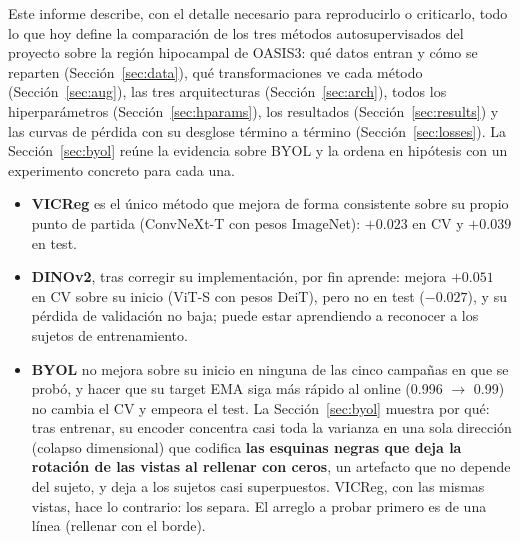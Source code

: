 \documentclass[11pt,a4paper]{article}
\begin{document}
Este informe describe, con el detalle necesario para reproducirlo o criticarlo, todo
lo que hoy define la comparación de los tres métodos autosupervisados del proyecto
sobre la región hipocampal de OASIS3: qué datos entran y cómo se reparten
(Sección~\ref{sec:data}), qué transformaciones ve cada método (Sección~\ref{sec:aug}),
las tres arquitecturas (Sección~\ref{sec:arch}), todos los hiperparámetros
(Sección~\ref{sec:hparams}), los resultados (Sección~\ref{sec:results}) y las curvas de
pérdida con su desglose término a término (Sección~\ref{sec:losses}). La
Sección~\ref{sec:byol} reúne la evidencia sobre BYOL y la ordena en hipótesis con un
experimento concreto para cada una.

\begin{tldrbox}
\begin{itemize}[leftmargin=12pt]
\item \textbf{VICReg} es el único método que mejora de forma consistente sobre su propio
  punto de partida (ConvNeXt-T con pesos ImageNet): $+0.023$ en CV y $+0.039$ en test.
\item \textbf{DINOv2}, tras corregir su implementación, por fin aprende: mejora $+0.051$
  en CV sobre su inicio (ViT-S con pesos DeiT), pero no en test ($-0.027$), y su pérdida de
  validación no baja; puede estar aprendiendo a reconocer a los sujetos de entrenamiento.
\item \textbf{BYOL} no mejora sobre su inicio en ninguna de las cinco campañas en que se
  probó, y hacer que su target EMA siga más rápido al online (0.996 $\rightarrow$ 0.99) no
  cambia el CV y empeora el test. La Sección~\ref{sec:byol} muestra por qué: tras entrenar,
  su encoder concentra casi toda la varianza en una sola dirección (colapso dimensional) que
  codifica \textbf{las esquinas negras que deja la rotación de las vistas al rellenar con
  ceros}, un artefacto que no depende del sujeto, y deja a los sujetos casi superpuestos.
  VICReg, con las mismas vistas, hace lo contrario: los separa. El arreglo a probar primero
  es de una línea (rellenar con el borde).
\end{itemize}
\end{tldrbox}

\begin{table}[H]
\centering
\small
\TablaResultados
\caption{Media de AUROC, F1-macro y AUPR del probe lineal (CV 5$\times$5 sobre 357 sujetos
AD/HC de train+val; test: 56 sujetos nunca vistos), promediada sobre semillas. ``Rango ef.'':
rango efectivo de los embeddings de train (espectro de varianza; ver
Sección~\ref{sec:byol-evidence}). ``Inicio'': el mismo encoder antes del entrenamiento SSL.}
\label{tab:results}
\end{table}
\end{document}
